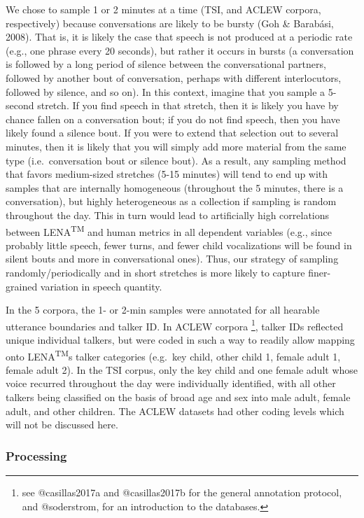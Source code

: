 \documentclass[english,table,man,floatsintext]{apa6}
\let\rmarkdownfootnote\footnote%
\def\footnote{\protect\rmarkdownfootnote}
\begin{document}
We chose to sample 1 or 2 minutes at a time (TSI, and ACLEW corpora, respectively) because conversations are likely to be bursty (Goh \& Barabási, 2008). That is, it is likely the case that speech is not produced at a periodic rate (e.g., one phrase every 20 seconds), but rather it occurs in bursts (a conversation is followed by a long period of silence between the conversational partners, followed by another bout of conversation, perhaps with different interlocutors, followed by silence, and so on). In this context, imagine that you sample a 5-second stretch. If you find speech in that stretch, then it is likely you have by chance fallen on a conversation bout; if you do not find speech, then you have likely found a silence bout. If you were to extend that selection out to several minutes, then it is likely that you will simply add more material from the same type (i.e.~conversation bout or silence bout). As a result, any sampling method that favors medium-sized stretches (5-15 minutes) will tend to end up with samples that are internally homogeneous (throughout the 5 minutes, there is a conversation), but highly heterogeneous as a collection if sampling is random throughout the day. This in turn would lead to artificially high correlations between LENA\textsuperscript{TM} and human metrics in all dependent variables (e.g., since probably little speech, fewer turns, and fewer child vocalizations will be found in silent bouts and more in conversational ones). Thus, our strategy of sampling randomly/periodically and in short stretches is more likely to capture finer-grained variation in speech quantity.

In the 5 corpora, the 1- or 2-min samples were annotated for all hearable utterance boundaries and talker ID. In ACLEW corpora \footnote{see @casillas2017a and  @casillas2017b for the general annotation protocol, and @soderstrom, for an introduction to the databases.}, talker IDs reflected unique individual talkers, but were coded in such a way to readily allow mapping onto LENA\textsuperscript{TM}s talker categories (e.g.~key child, other child 1, female adult 1, female adult 2). In the TSI corpus, only the key child and one female adult whose voice recurred throughout the day were individually identified, with all other talkers being classified on the basis of broad age and sex into male adult, female adult, and other children. The ACLEW datasets had other coding levels which will not be discussed here.

\hypertarget{processing}{%
\subsubsection{Processing}\label{processing}}
\end{document}
